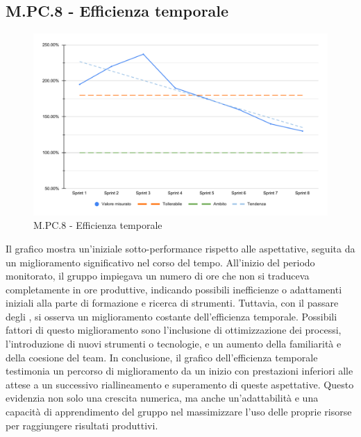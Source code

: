 \subsection{M.PC.8 - Efficienza temporale}
\begin{figure}[H]
    \centering
    \includegraphics[width=\textwidth]{assets/efficienza_temporale.pdf}
    \caption{M.PC.8 - Efficienza temporale}
\end{figure}

\par Il grafico mostra un'iniziale sotto-performance rispetto alle aspettative, seguita da un miglioramento significativo nel corso del tempo. All'inizio del periodo monitorato, il gruppo impiegava un numero di ore che non si traduceva completamente in ore produttive, indicando possibili inefficienze o adattamenti iniziali alla parte di formazione e ricerca di strumenti. Tuttavia, con il passare degli , si osserva un miglioramento costante dell'efficienza temporale. Possibili fattori di questo miglioramento sono l'inclusione di ottimizzazione dei processi, l'introduzione di nuovi strumenti o tecnologie, e un aumento della familiarità e della coesione del team.
In conclusione, il grafico dell'efficienza temporale testimonia un percorso di miglioramento da un inizio con prestazioni inferiori alle attese a un successivo riallineamento e superamento di queste aspettative. Questo evidenzia non solo una crescita numerica, ma anche un'adattabilità e una capacità di apprendimento del gruppo nel massimizzare l'uso delle proprie risorse per raggiungere risultati produttivi.
